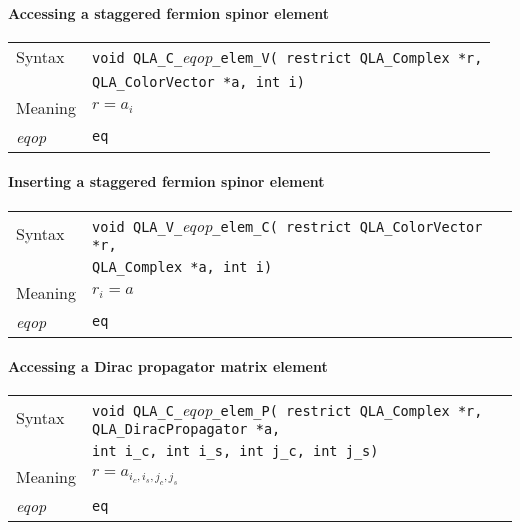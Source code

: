 \documentclass{article}
\newcommand{\tComplex}{QLA\ttdash Complex }
\newcommand{\tColorVector}{QLA\ttdash ColorVector }
\newcommand{\tDiracPropagator}{QLA\ttdash DiracPropagator }
\newcommand{\namespace}{QLA}
\newcommand{\ttdash}{{\tt \_}}
\newcommand{\extraarg}{}
\begin{document}
\paragraph{Accessing a staggered fermion spinor element}

\begin{flushleft}
  \begin{tabular}{|l|l|}
  \hline
  Syntax      & {\tt void \namespace}\ttdash{\tt C}\ttdash{\it eqop}\ttdash{\tt elem}\ttdash{\tt V( restrict \tComplex *r,}\\
              & {\tt \tColorVector *a, int i\extraarg)} \\
  \hline
  Meaning     & $r = a_i$\\
  \hline
  {\it eqop}  & {\tt eq} \\
  \hline
  \end{tabular}
\end{flushleft}

\paragraph{Inserting a staggered fermion spinor element}

\begin{flushleft}
  \begin{tabular}{|l|l|}
  \hline
  Syntax      & {\tt void \namespace}\ttdash{\tt V}\ttdash{\it eqop}\ttdash{\tt elem}\ttdash{\tt C( restrict \tColorVector *r,}\\
              & {\tt \tComplex *a, int i\extraarg)} \\
  \hline
  Meaning     & $r_i = a$\\
  \hline
  {\it eqop}  & {\tt eq} \\
  \hline
  \end{tabular}
\end{flushleft}

\paragraph{Accessing a Dirac propagator matrix element}

\begin{flushleft}
  \begin{tabular}{|l|l|}
  \hline
  Syntax      & {\tt void \namespace}\ttdash{\tt C}\ttdash{\it eqop}\ttdash{\tt elem}\ttdash{\tt P( restrict \tComplex *r, \tDiracPropagator *a,} \\
              & {\tt int i\_c, int i\_s, int j\_c, int j\_s\extraarg)} \\
  \hline
  Meaning     & $r = a_{i_c,i_s,j_c,j_s}$\\
  \hline
  {\it eqop}  & {\tt eq} \\
  \hline
  \end{tabular}
\end{flushleft}
\end{document}
